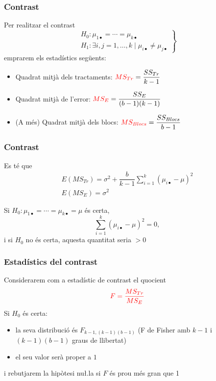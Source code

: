 \documentclass[12pt,t]{beamer}
\newcommand{\red}[1]{\textcolor{red}{#1}}
\renewcommand{\emph}[1]{{\color{red}#1}}
\theoremstyle{plain}
\theoremstyle{definition}
\begin{document}
\begin{frame}
\frametitle{Contrast}

Per realitzar  el contrast 
$$
\left.
\begin{array}{l}
H_0 :  \mu_{1\bullet}=\cdots =\mu_{k\bullet} \\
H_1 : \exists i,j=1,\ldots ,k\mid  \mu_{i\bullet}
\neq \mu_{j\bullet}
\end{array}
\right\}
$$
emprarem els  estadístics següents:
\begin{itemize}
\item Quadrat mitjà dels tractaments: $\red{MS_{Tr}}=\dfrac{SS_{Tr}}{k-1}$
\medskip

\item Quadrat mitjà de l'error: $\red{MS_E} = \dfrac{SS_E}{(b-1) (k-1)}$
\medskip

\item (A més) Quadrat mitjà dels blocs:
$\red{MS_{Blocs}}=\dfrac{SS_{Blocs}}{b-1}$
\end{itemize}
\end{frame}



\begin{frame}
\frametitle{Contrast}
Es té que
$$
\begin{array}{l}
E(MS_{Tr})=\sigma^2 + \dfrac{b}{k-1}\sum\limits_{i=1}^k (\mu_{i\bullet}-\mu)^2 \\
E(MS_E)=\sigma^2
\end{array}
$$

Si $H_0:\mu_{1\bullet}=\cdots =\mu_{k\bullet}=\mu$ és certa,
$$
\sum\limits_{i=1}^k (\mu_{i\bullet}-\mu)^2 = 0,
$$
i si $H_0$ no és certa, aquesta quantitat seria $>0$
\end{frame}


\begin{frame}
\frametitle{Estadístics del contrast}

Considerarem com a \emph{estadístic de contrast} el quocient 
$$
\red{F=\frac{MS_{Tr}}{MS_E}}
$$
Si $H_0$ és certa:
\medskip

\begin{itemize}
\item la seva distribució és $F_{k-1,(k-1)(b-1)}$ (F de Fisher 
amb $k-1$ i $(k-1)(b-1)$ graus de llibertat)
\medskip

\item el seu valor serà proper a $1$
\end{itemize}
\medskip

i rebutjarem la hipòtesi nu\l.la si $F$ és prou més gran que 1



\end{frame}
\end{document}
